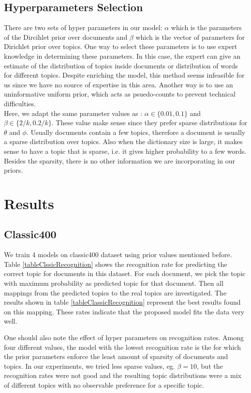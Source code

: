 \documentclass[twoside,12pt]{article}
\begin{document}
\subsection{Hyperparameters Selection}
There are two sets of hyper parameters in our model: $\alpha$ which is the parameters of the Dircihlet prior over documents and $\beta$ which is the vector of parameters for Dirichlet prior over topics. One way to select these parameters is to use expert knowledge in determining these parameters. In this case, the expert can give an estimate of the distribution of topics inside documents or distribution of words for different topics. Despite enriching the model, this method seems infeasible for us since we have no source of expertise in this area. Another way is to use an uninformative uniform prior, which acts as psuedo-counts to prevent technical difficulties.\\
Here, we adapt the same parameter values as \cite{fastlda}: $\alpha \in \{0.01,0.1\}$ and $\beta\in\{2/k,0.2/k\}$. These value make sense since they prefer sparse distributions for $\theta$ and $\phi$. Usually documents contain a few topics, therefore a document is usually a sparse distribution over topics. Also when the dictionary size is large, it makes sense to have a topic that is sparse, i.e. it gives higher probability to a few words. Besides the sparsity, there is no other information we are incorporating in our priors. 

\section{Results}


\subsection{Classic400}
We train 4 models on classic400 dataset using prior values mentioned before. Table \ref{tableClssicRecognition} shows the recognition rate for predicting the correct topic for documents in this dataset. For each document, we pick the topic with maximum probability as predicted topic for that document. Then all mappings from the predicted topics to the real topics are investigated. The results shown in table \ref{tableClassicRecognition} represent the best results found on this mapping. These rates indicate that the proposed model fits the data very well.

One should also note the effect of hyper parameters on recognition rates. Among four different values, the model with the lowest recognition rate is the for which the prior parameters enforce the least amount of sparsity of documents and topics. In our experiments, we tried less sparse values, eg. $\beta=10$, but the recognition rates were not good and the resulting topic distributions were a mix of different topics with no observable preference for a specific topic.
\end{document}
